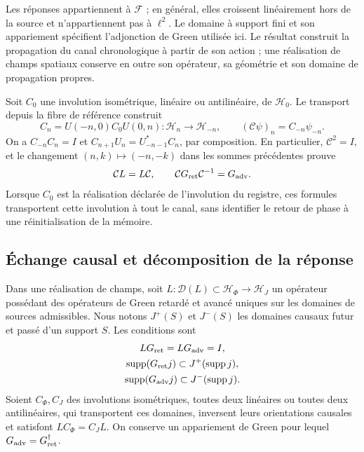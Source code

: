 Les réponses appartiennent à \(\mathcal F\) ; en général, elles croissent
linéairement hors de la source et n'appartiennent pas à \(\ell^2\).
Le domaine à support fini et son appariement spécifient l'adjonction
de Green utilisée ici. Le résultat construit la propagation du canal
chronologique à partir de son action ; une réalisation de champs spatiaux conserve
en outre son opérateur, sa géométrie et son domaine de propagation propres.

Soit \(C_0\) une involution isométrique, linéaire ou antilinéaire, de \(\mathcal H_0\). Le transport depuis la fibre de référence construit
\[
 C_n=U(-n,0)C_0U(0,n):\mathcal H_n\longrightarrow\mathcal H_{-n},
 \qquad (\mathcal C\psi)_n=C_{-n}\psi_{-n}.
\]
On a \(C_{-n}C_n=I\) et \(C_{n+1}U_n=U_{-n-1}^*C_n\), par composition. En particulier, \(\mathcal C^2=I\), et le changement \((n,k)\mapsto(-n,-k)\) dans les sommes précédentes prouve
\begin{equation}
 \mathcal C L=L\mathcal C,\qquad
 \mathcal C G_{\rm ret}\mathcal C^{-1}=G_{\rm adv}.
 \label{vii:vii:eq:intercambio-green-cronologico}
\end{equation}
Lorsque \(C_0\) est la réalisation déclarée de l'involution du registre, ces formules transportent cette involution à tout le canal, sans identifier le retour de phase à une réinitialisation de la mémoire.

\subsection{Échange causal et décomposition de la réponse}
\label{vii:vii:subsec:green-realizacion-campos}

Dans une réalisation de champs, soit
\(L:\mathcal D(L)\subset\mathcal H_\Phi\to\mathcal H_J\)
un opérateur possédant des opérateurs de Green retardé et avancé uniques sur les domaines de
sources admissibles. Nous notons \(J^+(S)\) et \(J^-(S)\) les
domaines causaux futur et passé d'un support \(S\). Les conditions sont
\[
 \begin{gathered}
 LG_{\rm ret}=LG_{\rm adv}=I,\\
 \operatorname{supp}(G_{\rm ret}j)\subset J^+(\operatorname{supp}j),\\
 \operatorname{supp}(G_{\rm adv}j)\subset J^-(\operatorname{supp}j).
 \end{gathered}
\]
Soient \(C_\Phi,C_J\) des involutions isométriques, toutes deux linéaires ou toutes deux
antilinéaires, qui transportent ces domaines,
inversent leurs orientations causales et satisfont
\(LC_\Phi=C_JL\). On conserve un appariement de Green pour lequel
\(G_{\rm adv}=G_{\rm ret}^{\dagger}\).


